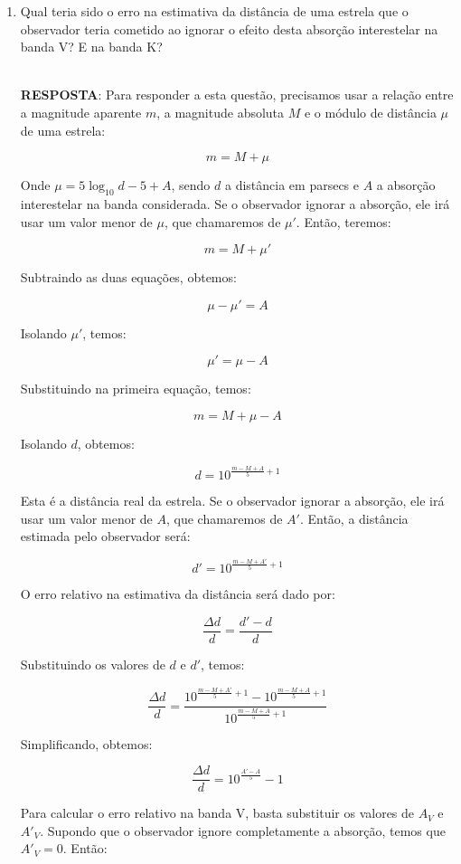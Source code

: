 \documentclass[a4paper,12pt]{article}
\begin{document}
\begin{enumerate}
\begin{enumerate}
\noindent\hrulefill

\item Qual teria sido o erro na estimativa da distância de uma estrela que o observador teria cometido ao ignorar o efeito desta absorção interestelar na banda V? E na banda K?

\noindent\hrulefill\\\textbf{RESPOSTA}: Para responder a esta questão, precisamos usar a relação entre a magnitude aparente $m$, a magnitude absoluta $M$ e o módulo de distância $\mu$ de uma estrela:

$$m = M + \mu$$

Onde $\mu = 5 \log_{10} d - 5 + A$, sendo $d$ a distância em parsecs e $A$ a absorção interestelar na banda considerada. Se o observador ignorar a absorção, ele irá usar um valor menor de $\mu$, que chamaremos de $\mu'$. Então, teremos:

$$m = M + \mu'$$

Subtraindo as duas equações, obtemos:

$$\mu - \mu' = A$$

Isolando $\mu'$, temos:

$$\mu' = \mu - A$$

Substituindo na primeira equação, temos:

$$m = M + \mu - A$$

Isolando $d$, obtemos:

$$d = 10^{\frac{m - M + A}{5} + 1}$$

Esta é a distância real da estrela. Se o observador ignorar a absorção, ele irá usar um valor menor de $A$, que chamaremos de $A'$. Então, a distância estimada pelo observador será:

$$d' = 10^{\frac{m - M + A'}{5} + 1}$$

O erro relativo na estimativa da distância será dado por:

$$\frac{\Delta d}{d} = \frac{d' - d}{d}$$

Substituindo os valores de $d$ e $d'$, temos:

$$\frac{\Delta d}{d} = \frac{10^{\frac{m - M + A'}{5} + 1} - 10^{\frac{m - M + A}{5} + 1}}{10^{\frac{m - M + A}{5} + 1}}$$

Simplificando, obtemos:

$$\frac{\Delta d}{d} = 10^{\frac{A' - A}{5}} - 1$$

Para calcular o erro relativo na banda V, basta substituir os valores de $A_V$ e $A'_V$. Supondo que o observador ignore completamente a absorção, temos que $A'_V = 0$. Então:


\end{enumerate}
\end{enumerate}
\end{document}
